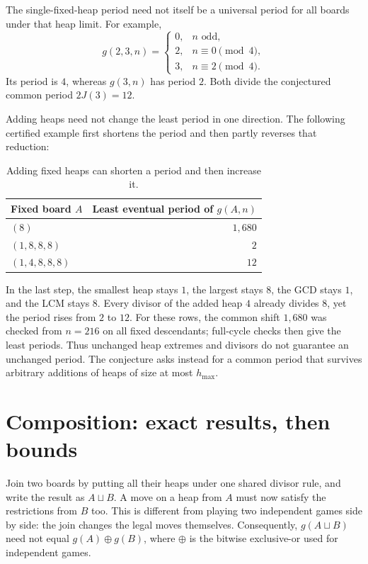 \documentclass[10pt,a4paper]{article}
\newcommand{\join}{\sqcup}
\begin{document}
The single-fixed-heap period need not itself be a universal period
for all boards under that heap limit. For example,
\[
 g(2,3,n)=
 \begin{cases}
 0,&n\text{ odd},\\
 2,&n\equiv0\pmod4,\\
 3,&n\equiv2\pmod4.
 \end{cases}
\]
Its period is $4$, whereas $g(3,n)$ has period $2$. Both divide
the conjectured common period $2J(3)=12$.

Adding heaps need not change the least period in one direction.
The following certified example first shortens the period and
then partly reverses that reduction:

\begin{table}[H]
\centering
\begin{tabular}{@{}l r@{}}
\toprule
Fixed board $A$ & Least eventual period of $g(A,n)$\\
\midrule
$(8)$ & $1{,}680$\\
$(1,8,8,8)$ & $2$\\
$(1,4,8,8,8)$ & $12$\\
\bottomrule
\end{tabular}
\caption{Adding fixed heaps can shorten a period and then increase it.}
\label{tab:periodjoins}
\end{table}

In the last step, the smallest heap stays $1$, the largest stays
$8$, the GCD stays $1$, and the LCM stays $8$. Every divisor of
the added heap $4$ already divides $8$, yet the period rises from
$2$ to $12$. For these rows, the common shift $1{,}680$ was checked
from $n=216$ on all fixed descendants; full-cycle checks then give
the least periods. Thus unchanged heap extremes and divisors do
not guarantee an unchanged period. The conjecture asks instead
for a common period that survives arbitrary additions of heaps
of size at most $h_{\max}$.


\section{Composition: exact results, then bounds}
\label{sec:composition}

Join two boards by putting all their heaps under one shared divisor
rule, and write the result as $A\join B$. A move on a heap from $A$
must now satisfy the restrictions from $B$ too. This is different
from playing two independent games side by side: the join changes
the legal moves themselves.
Consequently, $g(A\join B)$ need not equal $g(A)\mathbin{\oplus}g(B)$,
where $\oplus$ is the bitwise exclusive-or used for independent games.
\end{document}
